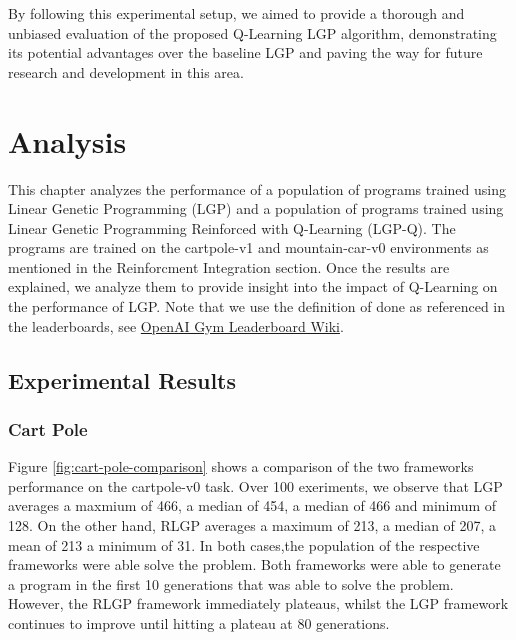 \documentclass[12pt, final]{dalcsthesis}
\begin{document}
By following this experimental setup, we aimed to provide a thorough and unbiased evaluation of the proposed Q-Learning LGP algorithm, demonstrating its potential advantages over the baseline LGP and paving the way for future research and development in this area.

\chapter{Analysis}

This chapter analyzes the performance of a population of programs trained using Linear Genetic Programming (LGP)
and a population of programs trained using Linear Genetic Programming Reinforced with Q-Learning (LGP-Q). The programs
are trained on the cartpole-v1 and mountain-car-v0 environments \cite{1606.01540} as mentioned in the Reinforcment Integration section.
Once the results are explained, we analyze them to provide insight into the impact of Q-Learning on the performance of LGP. Note that we use the definition of done as referenced in the leaderboards, see \href{https://github.com/openai/gym/wiki/Leaderboard}{OpenAI Gym Leaderboard Wiki}.

\section{Experimental Results}

\subsection{Cart Pole}

Figure \ref{fig:cart-pole-comparison} shows a comparison of the two frameworks performance on the cartpole-v0 task. Over 100 exeriments, we observe that LGP averages a maxmium of 466, a median of 454, a median of 466 and minimum of 128. On the other hand, RLGP
averages a maximum of 213, a median of 207, a mean of 213 a minimum of 31. In both cases,the population of the respective frameworks were able solve the problem. Both frameworks were able
to generate a program in the first 10 generations that was able to solve the problem. However, the RLGP framework immediately plateaus, whilst the LGP framework continues to improve until hitting a plateau at 80 generations.
\end{document}
